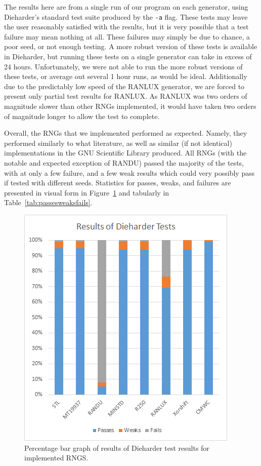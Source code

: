The results here are from a single run of our program on each generator, using Dieharder's standard test suite produced by the \texttt{-a} flag. These tests may leave the user reasonably satisfied with the results, but it is very possible that a test failure may mean nothing at all. These failures may simply be due to chance, a poor seed, or not enough testing. A more robust version of these tests is available in Dieharder, but running these tests on a single generator can take in excess of 24 hours. Unfortunately, we were not able to run the more robust versions of these tests, or average out several 1 hour runs, as would be ideal. Additionally due to the predictably low speed of the RANLUX generator, we are forced to present only partial test results for RANLUX. As RANLUX was two orders of magnitude slower than other RNGs implemented, it would have taken two orders of magnitude longer to allow the test to complete.

Overall, the RNGs that we implemented performed as expected. Namely, they performed similarly to what literature, as well as similar (if not identical) implementations in the GNU Scientific Library produced. All RNGs (with the notable and expected exception of RANDU) passed the majority of the tests, with at only a few failure, and a few weak results which could very possibly pass if tested with different seeds. Statistics for passes, weaks, and failures are presented in visual form in Figure~\ref{fig:passesweaksfails} and tabularly in Table~\ref{tab:passesweaksfails}.

\begin{figure}[tb]
    \begin{center}
        \includegraphics[width=\linewidth]{figures/passesweaksfails.png}
    \end{center}
    \caption{Percentage bar graph of results of Dieharder test results for implemented RNGS.}
    \label{fig:passesweaksfails}
\end{figure}

